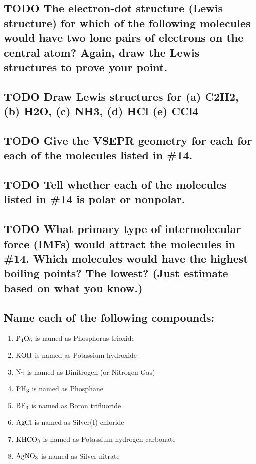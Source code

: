 \documentclass[11pt]{article}
\begin{document}
\subsection{{\bfseries\sffamily TODO} The electron-dot structure (Lewis structure) for which of the following molecules would have two lone pairs of electrons on the central atom? Again, draw the Lewis structures to prove your point.}
\label{sec:orgf1ffc4b}

\subsection{{\bfseries\sffamily TODO} Draw Lewis structures for (a) C2H2, (b) H2O, (c) NH3, (d) HCl (e) CCl4}
\label{sec:org8ab0b12}

\subsection{{\bfseries\sffamily TODO} Give the VSEPR geometry for each for each of the molecules listed in \#14.}
\label{sec:orgc8ff50f}

\subsection{{\bfseries\sffamily TODO} Tell whether each of the molecules listed in \#14 is polar or nonpolar.}
\label{sec:orga667990}

\subsection{{\bfseries\sffamily TODO} What primary type of intermolecular force (IMFs) would attract the molecules in \#14. Which molecules would have the highest boiling points? The lowest? (Just estimate based on what you know.)}
\label{sec:orgebb8b16}

\subsection{Name each of the following compounds:}
\label{sec:orge545716}
\begin{enumerate}
\item \(\ce{P4O6}\) is named as Phosphorus trioxide
\item \(\ce{KOH}\) is named as Potassium hydroxide
\item \(\ce{N2}\) is named as Dinitrogen (or Nitrogen Gas)
\item \(\ce{PH3}\) is named as Phosphane
\item \(\ce{BF3}\) is named as Boron trifluoride
\item \(\ce{AgCl}\) is named as Silver(I) chloride
\item \(\ce{KHCO3}\) is named as Potassium hydrogen carbonate
\item \(\ce{AgNO3}\) is named as Silver nitrate
\end{enumerate}
\end{document}
